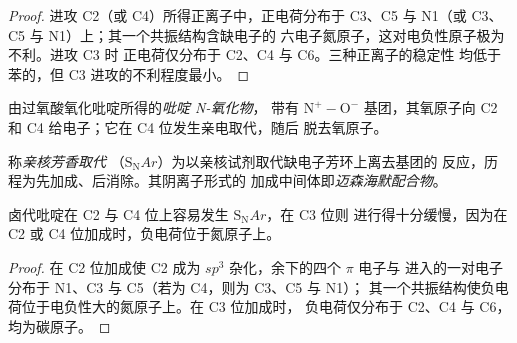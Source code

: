 \begin{proof}
进攻 C2（或 C4）所得正离子中，正电荷分布于 C3、C5
与 N1（或 C3、C5 与 N1）上；其一个共振结构含缺电子的
六电子氮原子，这对电负性原子极为不利。进攻 C3 时
正电荷仅分布于 C2、C4 与 C6。三种正离子的稳定性
均低于苯的，但 C3 进攻的不利程度最小。
\end{proof}

\begin{definition}[吡啶 N-氧化物]\label{def:b3:heterocycles:n-oxide}
由过氧酸氧化吡啶所得的\emph{吡啶 N-氧化物}，
带有 $\mathrm{N^+{-}O^-}$ 基团，其氧原子向 C2
和 C4 给电子；它在 C4 位发生亲电取代，随后
脱去氧原子。
\end{definition}

\begin{definition}[亲核芳香取代]\label{def:b3:heterocycles:snar}
称\emph{亲核芳香取代}
（$\mathrm S_\mathrm NAr$）为以亲核试剂取代缺电子芳环上离去基团的
反应，历程为先加成、后消除。其阴离子形式的
加成中间体即\emph{迈森海默配合物}。
\end{definition}

\begin{proposition}\label{prop:b3:heterocycles:snar-positions}
卤代吡啶在 C2 与 C4 位上容易发生 $\mathrm S_\mathrm NAr$，在 C3 位则
进行得十分缓慢，因为在 C2 或 C4 位加成时，负电荷位于氮原子上。
\end{proposition}

\begin{proof}
在 C2 位加成使 C2 成为 $sp^3$ 杂化，余下的四个 $\pi$ 电子与
进入的一对电子分布于 N1、C3 与 C5（若为 C4，则为 C3、C5 与 N1）；
其一个共振结构使负电荷位于电负性大的氮原子上。在 C3 位加成时，
负电荷仅分布于 C2、C4 与 C6，均为碳原子。
\end{proof}


